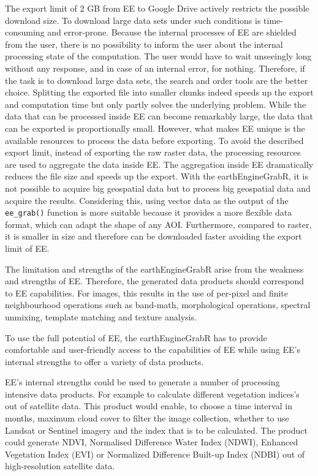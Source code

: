 The export limit of 2 GB from EE to Google Drive actively restricts the possible download size. To download large data sets under such conditions is time-consuming and error-prone. Because the internal processes of EE are shielded from the user, there is no possibility to inform the user about the internal processing state of the computation. The user would have to wait unseeingly long without any response, and in case of an internal error, for nothing.
Therefore, if the task is to download large data sets, the search and order tools are the better choice.
Splitting the exported file into smaller chunks indeed speeds up the export and computation time but only partly solves the underlying problem.
While the data that can be processed inside EE can become remarkably large, the data that can be exported is proportionally small.
However, what makes EE unique is the available resources to process the data before exporting. 
To avoid the described export limit, instead of exporting the raw raster data, the processing resources are used to aggregate the data inside EE.  The aggregation inside EE dramatically reduces the file size and speeds up the export. 
With the earthEngineGrabR, it is not possible to acquire big geospatial data but to process big geospatial data and acquire the results.
Considering this, using vector data as the output of the \texttt{ee\_grab()} function is more suitable because it provides a more flexible data format, which can adapt the shape of any AOI. Furthermore, compared to raster, it is smaller in size and therefore can be downloaded faster avoiding the export limit of EE. 

The limitation and strengths of the earthEngineGrabR arise from the weakness and strengths of EE. Therefore, the generated data products should correspond to EE capabilities. For images, this results in the use of per-pixel and finite neighbourhood operations such as band-math, morphological operations, spectral unmixing, template matching and texture analysis.

To use the full potential of EE, the earthEngineGrabR has to provide comfortable and user-friendly access to the capabilities of EE while using EE's internal strengths to offer a variety of data products.

EE's internal strengths could be used to generate a number of processing intensive data products. For example to calculate different vegetation indices's out of satellite data. This product would enable, to choose a time interval in months, maximum cloud cover to filter the image collection, whether to use Landsat or Sentinel imagery and the index that is to be calculated. The product could generate NDVI, Normalised Difference Water Index (NDWI), Enhanced Vegetation Index (EVI) or Normalized Difference Built-up Index (NDBI) out of high-resolution satellite data.




